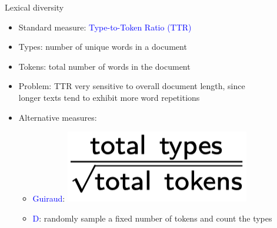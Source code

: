 \documentclass[english]{beamer}
\begin{document}
\begin{frame}{Lexical diversity}
\begin{itemize}
\setlength{\itemsep}{0.9em}
\setlength{\itemindent}{-0.5em}
\item Standard measure: \textcolor{blue}{Type-to-Token Ratio (TTR)}
\item Types: number of unique words in a document
\item Tokens: total number of words in the document
\item Problem: TTR very sensitive to overall document length, since\\
\hspace{-5pt}longer texts tend to exhibit more word repetitions
\item Alternative measures: 
\vspace{5pt}
\begin{itemize}
\setlength{\itemsep}{0.5em}
\setlength{\itemindent}{-1em}
\item \textcolor{blue}{Guiraud}: \includegraphics[scale=0.3]{Images/guiraud}
\item \textcolor{blue}{D}: randomly sample a fixed number of tokens and count the types
\end {itemize}
\end{itemize}
\end{frame}
\end{document}
